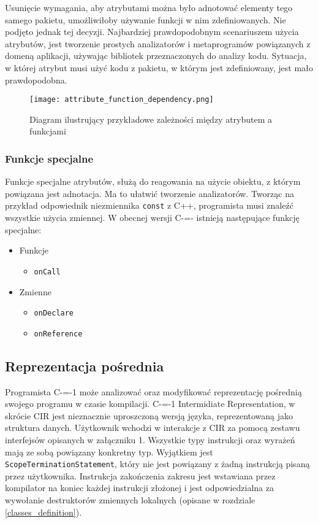 Usunięcie wymagania, aby atrybutami można było adnotować elementy tego samego pakietu, umożliwiłoby używanie funkcji w nim zdefiniowanych.
Nie podjęto jednak tej decyzji.
Najbardziej prawdopodobnym scenariuszem użycia atrybutów, jest tworzenie prostych analizatorów i metaprogramów powiązanych z domeną aplikacji, używając bibliotek przeznaczonych do analizy kodu.
Sytuacja, w której atrybut musi użyć kodu z pakietu, w którym jest zdefiniowany, jest mało prawdopodobna.

\begin{figure}
	\caption{Diagram ilustrujący przykładowe zależności między atrybutem a funkcjami}
	\label{design:attributes:attribute_function_dependendcy}
	\texttt{[image: attribute\_function\_dependency.png]}
\end{figure}

\subsubsection{Funkcje specjalne}
\label{design:attributes:special_functions}

Funkcje specjalne atrybutów, służą do reagowania na użycie obiektu, z którym powiązana jest adnotacja.
Ma to ułatwić tworzenie analizatorów.
Tworząc na przykład odpowiednik niezmiennika \lstinline{const} z C++, programista musi znaleźć wszystkie użycia zmiennej.
W obecnej wersji C-=- istnieją następujące funkcję specjalne:
\begin{itemize}
	\item Funkcje\begin{itemize}
		\item \lstinline{onCall}
	\end{itemize}
	\item Zmienne\begin{itemize}
		\item \lstinline{onDeclare}
		\item \lstinline{onReference}
	\end{itemize}
\end{itemize}

\subsection{Reprezentacja pośrednia}\label{reprezentacja_posrednia}
Programista C-=-1 może analizować oraz modyfikować reprezentację pośrednią swojego programu w czasie kompilacji.
C-=-1 Intermidiate Representation, w skrócie CIR jest nieznacznie uproszczoną wersją języka, reprezentowaną jako struktura danych.
Użytkownik wchodzi w interakcje z CIR za pomocą zestawu interfejsów opisanych w załączniku 1.
Wszystkie typy instrukcji oraz wyrażeń mają ze sobą powiązany konkretny typ.
Wyjątkiem jest \lstinline{ScopeTerminationStatement}, który nie jest powiązany z żadną instrukcją pisaną przez użytkownika.
Instrukcja zakończenia zakresu jest wstawiana przez kompilator na koniec każdej instrukcji złożonej i jest odpowiedzialna za wywołanie destruktorów zmiennych lokalnych (opisane w rozdziale \ref{classes_definition}).

